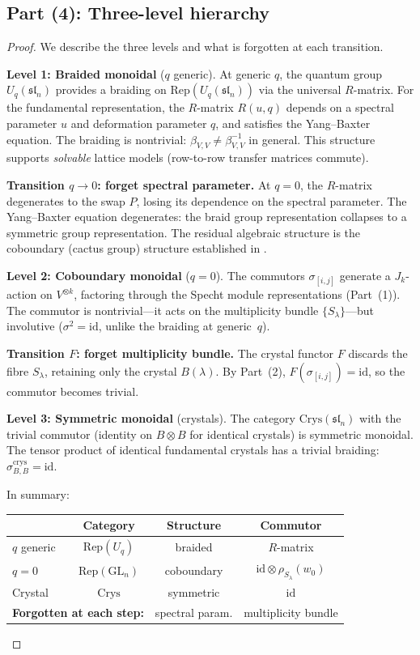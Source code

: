 \documentclass[11pt]{article}
\theoremstyle{remark}
\newcommand{\Rep}{\mathrm{Rep}}
\newcommand{\Crys}{\mathrm{Crys}}
\newcommand{\GL}{\mathrm{GL}}
\newcommand{\id}{\mathrm{id}}
\begin{document}
\subsection{Part (4): Three-level hierarchy}

\begin{proof}
We describe the three levels and what is forgotten at each transition.

\medskip
\textbf{Level 1: Braided monoidal} ($q$ generic).
At generic $q$, the quantum group $U_q(\mathfrak{sl}_n)$ provides a
braiding on $\Rep(U_q(\mathfrak{sl}_n))$ via the universal $R$-matrix.
For the fundamental representation, the $R$-matrix $R(u, q)$ depends on
a spectral parameter $u$ and deformation parameter $q$, and satisfies
the Yang--Baxter equation. The braiding is nontrivial:
$\beta_{V,V} \neq \beta_{V,V}^{-1}$ in general. This structure supports
\emph{solvable} lattice models (row-to-row transfer matrices commute).

\medskip
\textbf{Transition $q \to 0$: forget spectral parameter.}
At $q = 0$, the $R$-matrix degenerates to the swap $P$, losing its
dependence on the spectral parameter. The Yang--Baxter equation
degenerates: the braid group representation collapses to a symmetric
group representation. The residual algebraic structure is the
coboundary (cactus group) structure established in \cite{clio-cactus}.

\medskip
\textbf{Level 2: Coboundary monoidal} ($q = 0$).
The commutors $\sigma_{[i,j]}$ generate a $J_k$-action on $V^{\otimes k}$,
factoring through the Specht module representations
(Part~(1)). The commutor is nontrivial---it acts on the multiplicity
bundle $\{S_\lambda\}$---but involutive ($\sigma^2 = \id$, unlike the
braiding at generic~$q$).

\medskip
\textbf{Transition $F$: forget multiplicity bundle.}
The crystal functor $F$ discards the fibre $S_\lambda$, retaining only
the crystal $B(\lambda)$. By Part~(2), $F(\sigma_{[i,j]}) = \id$,
so the commutor becomes trivial.

\medskip
\textbf{Level 3: Symmetric monoidal} (crystals).
The category $\Crys(\mathfrak{sl}_n)$ with the trivial commutor
(identity on $B \otimes B$ for identical crystals) is symmetric
monoidal. The tensor product of identical fundamental crystals
has a trivial braiding: $\sigma^{\mathrm{crys}}_{B,B} = \id$.

\medskip
\noindent In summary:

\begin{center}
\renewcommand{\arraystretch}{1.3}
\begin{tabular}{lccc}
& \textbf{Category} & \textbf{Structure} & \textbf{Commutor} \\
\hline
$q$ generic & $\Rep(U_q)$ & braided & $R$-matrix \\
$q = 0$ & $\Rep(\GL_n)$ & coboundary & $\id \otimes \rho_{S_\lambda}(w_0)$ \\
Crystal & $\Crys$ & symmetric & $\id$ \\
\hline
\multicolumn{2}{l}{\textbf{Forgotten at each step:}} & spectral param. & multiplicity bundle
\end{tabular}
\end{center}


\end{proof}
\end{document}
